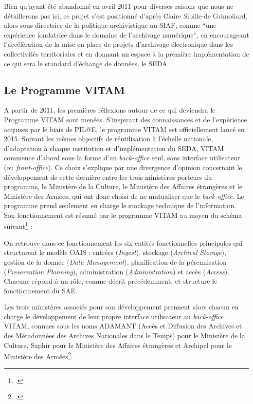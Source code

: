 Bien qu’ayant été abandonné en avril 2011 pour diverses raisons que nous ne détaillerons pas ici, ce projet s’est positionné d’après Claire Sibille-de Grimoüard, alors sous-directrice de la politique archivistique au SIAF, comme  \enquote{une expérience fondatrice dans le domaine de l’archivage numérique}, en encourageant l'accélération de la mise en place de projets d’archivage électronique dans les collectivités territoriales et en donnant un espace à la première implémentation de ce qui sera le standard d’échange de données, le \gls{SEDA}.

\subsection{Le Programme VITAM}
A partir de 2011, les premières réflexions autour de ce qui deviendra le Programme \gls{VITAM} sont menées. S’inspirant des connaissances et de l’expérience acquises par le biais de PIL@E, le programme \gls{VITAM} est officiellement lancé en 2015. Suivant les mêmes objectifs de réutilisation à l’échelle nationale, d’adaptation à chaque institution et d’implémentation du \gls{SEDA}, \gls{VITAM} commence d’abord sous la forme d’un \textit{\gls{back-office}} seul, sans interface utilisateur (ou \textit{\gls{front-office}}). Ce choix s’explique par une divergence d’opinion concernant le développement de cette dernière entre les trois ministères porteurs du programme, le Ministère de la Culture, le Ministère des Affaires étrangères et le Ministère des Armées, qui ont donc choisi de ne mutualiser que le \textit{\gls{back-office}}. Le programme prend seulement en charge le stockage technique de l’information. Son fonctionnement est résumé par le programme \gls{VITAM} au moyen du schéma suivant\footcite{noauthor_focus_nodate} :

\clearpage 




On retrouve dans ce fonctionnement les six entités fonctionnelles principales qui structurent le modèle \gls{OAIS} : entrées (\textit{Ingest}), stockage (\textit{Archival Storage}), gestion de la donnée (\textit{Data Management}), planification de la pérennisation (\textit{Preservation Planning}), administration (\textit{Administration}) et accès (\textit{Access}). Chacune répond à un rôle, comme décrit précédemment, et structure le fonctionnement du \gls{SAE}. 


Les trois ministères associés pour son développement prennent alors chacun en charge le développement de leur propre interface utilisateur au \textit{\gls{back-office}} \gls{VITAM}, connues sous les noms ADAMANT (Accès et Diffusion des Archives et des Métadonnées des Archives Nationales dans le Temps) pour le Ministère de la Culture, Saphir pour le Ministère des Affaires étrangères et Archipel pour le Ministère des Armées\footcite{noauthor_et_nodate}.


